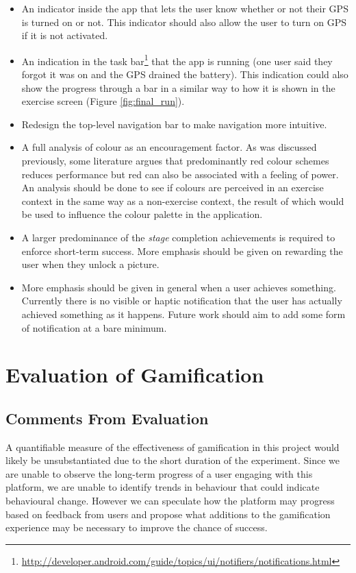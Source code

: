 \begin{itemize}
  \item An indicator inside the app that lets the user know whether or
    not their GPS is turned on or not. This indicator should also
    allow the user to turn on GPS if it is not activated.
  \item An indication in the task
    bar\footnote{\url{http://developer.android.com/guide/topics/ui/notifiers/notifications.html}}
    that the app is running (one user said they forgot it was on and
    the GPS drained the battery). This indication could also show the
    progress through a bar in a similar way to how it is shown in the
    exercise screen (Figure \ref{fig:final_run}).
  \item Redesign the top-level navigation bar to make navigation more
    intuitive. 
  \item A full analysis of colour as an encouragement factor. As was
    discussed previously, some literature argues that predominantly
    red colour schemes reduces performance\cite{colours_red} but red
    can also be associated with a feeling of power. An analysis should
    be done to see if colours are perceived in an exercise context in
    the same way as a non-exercise context, the result of which would
    be used to influence the colour palette in the application.
  \item A larger predominance of the \emph{stage} completion
    achievements is required to enforce short-term success. More
    emphasis should be given on rewarding the user  when they unlock a
    picture. 
  \item More emphasis should be given in general when a user achieves
    something. Currently there is no visible or haptic notification
    that the user has actually achieved something as it
    happens. Future work should aim to add some form of notification
    at a bare minimum.
\end{itemize}

\section{Evaluation of Gamification}
\subsection{Comments From Evaluation}
A quantifiable measure of the effectiveness of gamification in this
project would likely be unsubstantiated due to the short duration of 
the experiment. Since we are unable to observe the long-term progress
of a user engaging with this platform, we are unable to identify
trends in behaviour that could indicate behavioural change. However we
can speculate how the platform may progress based on feedback from
users and propose what additions to the gamification experience may be
necessary to improve the chance of success.

